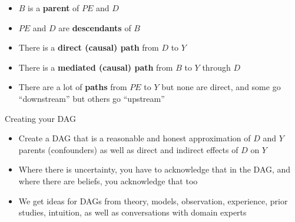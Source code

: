 \begin{frame}[plain]

  \begin{center}
  \end{center}

  \bigskip
  \begin{itemize}
    \item $B$ is a \textbf{parent} of $PE$ and $D$
    \item $PE$ and $D$ are \textbf{descendants} of $B$
    \item There is a \textbf{direct (causal) path} from $D$ to $Y$
    \item There is a \textbf{mediated (causal) path} from $B$ to $Y$ through $D$
    \item There are a lot of \textbf{paths} from $PE$ to $Y$ but none are direct, and some go ``downstream'' but others go ``upstream''
  \end{itemize}
\end{frame}





\begin{frame}{Creating your DAG}

	\begin{itemize}
	\item Create a DAG that is a reasonable and honest approximation of $D$ and $Y$ parents (confounders) as well as direct and indirect effects of $D$ on $Y$
	\item Where there is uncertainty, you have to acknowledge that in the DAG, and where there are beliefs, you acknowledge that too
	\item We get ideas for DAGs from theory, models, observation, experience, prior studies, intuition, as well as conversations with domain experts
	\end{itemize}

\end{frame}


